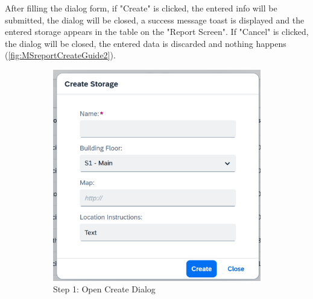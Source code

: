 After filling the dialog form, if "Create" is clicked, the entered info will be submitted, the dialog will be closed, a success message toast is displayed and the entered storage appears in the table on the "Report Screen". If "Cancel" is clicked, the dialog will be closed, the entered data is discarded and nothing happens (\autoref{fig:MSreportCreateGuide2}).


\begin{figure}[!htb]
    \centering
    \begin{subfigure}{0.45\linewidth}
        \includegraphics[width=\linewidth]{images/user_doc/storage/StorageReportPage/createStorageDlg.png}
        \caption{Step 1: Open Create Dialog}
    \end{subfigure}
    \hspace{5pt}
    \begin{subfigure}{0.4\linewidth}

\end{subfigure}
\end{figure}
